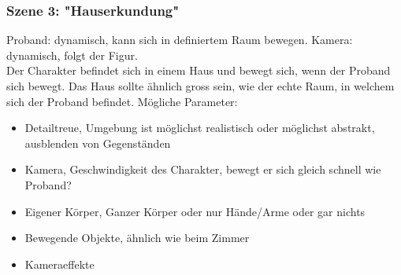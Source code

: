 \subsubsection{Szene 3: "Hauserkundung"}
Proband: dynamisch, kann sich in definiertem Raum bewegen.
Kamera: dynamisch, folgt der Figur. \\
Der Charakter befindet sich in einem Haus und bewegt sich, wenn der Proband sich bewegt. Das Haus sollte ähnlich gross sein, wie der echte Raum, in welchem sich der Proband befindet. 
Mögliche Parameter:
\begin{itemize}
\item Detailtreue, Umgebung ist möglichst realistisch oder möglichst abstrakt, ausblenden von Gegenständen
\item Kamera, Geschwindigkeit des Charakter, bewegt er sich gleich schnell wie Proband?
\item Eigener Körper, Ganzer Körper oder nur Hände/Arme oder gar nichts
\item Bewegende Objekte, ähnlich wie beim Zimmer
\item Kameraeffekte 
\end{itemize}

